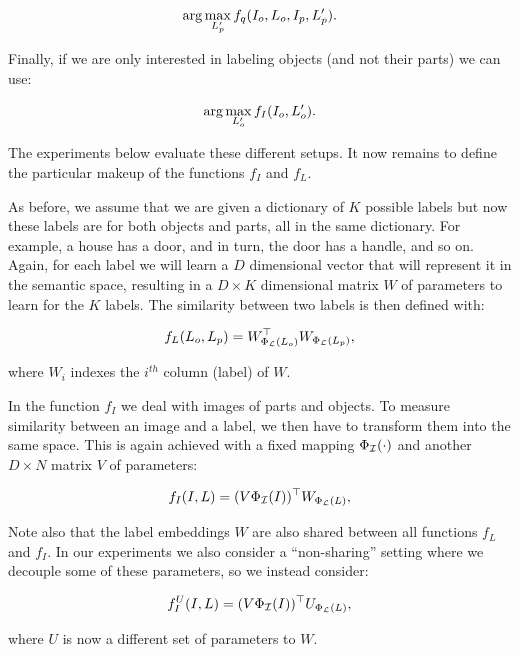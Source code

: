 \[ \arg\max_{L'_p}  f_q(I_o,L_o,I_p,L'_p).\]

Finally, if we are only interested in labeling objects (and not their parts) we can use:

\[ \arg\max_{L'_o}  f_I(I_o,L'_o).\]

The experiments below evaluate these different setups.  It now remains
to define the particular makeup of the functions $f_I$ and $f_L$.

As before, we assume that we are given a dictionary of $K$ possible
labels but now these labels are for both objects and parts, all in the
same dictionary. For example, a house has a door, and in turn, the
door has a handle, and so on.  Again, for each label we will learn a
$D$ dimensional vector that will represent it in the semantic space,
resulting in a $D \times K$ dimensional matrix $W$ of parameters to
learn for the $K$ labels.  The similarity between two labels is then
defined with:

\[ f_L(L_o, L_p) = W_{\Phi_{\cal L}(L_o)}^\top W_{\Phi_{\cal L}(L_p)},\]

where $W_i$ indexes the $i^{th}$ column (label) of $W$. 


In the function $f_I$ we deal with images of parts and objects.
To measure similarity between an image and a label, we then have to transform them into 
the same space. This is again achieved with a fixed mapping $\Phi_{\cal I}(\cdot)$
and another $D \times N$ matrix $V$ of parameters:

\[ f_I(I, L) =  (V \Phi_{\cal I}(I) )^\top W_{\Phi_{\cal L}(L)},\]


Note also that the label embeddings $W$ are also shared between all functions
$f_L$ and $f_I$.  In our experiments we also consider a ``non-sharing'' setting
where we decouple some of these parameters, so we instead consider:

\[ f_I^U(I, L)  =  (V \Phi_{\cal I}(I) )^\top U_{\Phi_{\cal L}(L)}, \]

where $U$ is now a different set of parameters to $W$.



